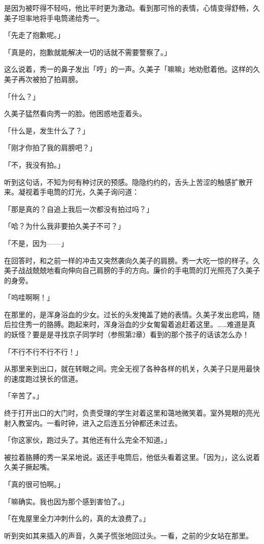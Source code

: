 \documentclass[UTF8]{ctexart}
\begin{document}
    是因为被吓得不轻吗，他比平时更为激动。看到那可怜的表情，心情变得舒畅，久美子坦率地将手电筒递给秀一。

    「先走了抱歉呢。」

    「真是的，抱歉就能解决一切的话就不需要警察了。」

    这么说着，秀一的鼻子发出「哼」的一声。久美子「嘛嘛」地劝慰着他。这样的久美子再次被拍了拍肩膀。

    「什么？」

    久美子猛然看向秀一的脸。他困惑地歪着头。

    「什么是，发生什么了？」

    「刚才你拍了我的肩膀吧？」

    「不，我没有拍。」

    听到这句话，不知为何有种讨厌的预感。隐隐约约的，舌头上苦涩的触感扩散开来。凝视着手电筒的灯光，久美子询问道：

    「那是真的？自追上我后一次都没有拍过吗？」

    「哈？为什么我非要拍久美子不可？」

    「不是，因为——」

    在回答时，和之前一样的冲击又突然袭向久美子的肩膀。秀一大吃一惊的样子。久美子战战兢兢地看向伸向自己肩膀的手的方向。廉价的手电筒的灯光照亮了久美子的身旁。

    「呜哇啊啊！」

    在那里的，是浑身浴血的少女。过长的头发掩盖了她的表情。久美子发出悲鸣，随后拉住秀一的胳膊。跑起来时，浑身浴血的少女匍匐着追赶着这里。……难道是真的妖怪？要是是寻找京子同学时（参照第2章）看到的那个孩子的话该怎么办！

    「不行不行不行不行！」

    从那里来到出口，就在转眼之间。完全无视了各种各样的机关，久美子只是用最快的速度跑过狭长的信道。

    「辛苦了。」

    终于打开出口的大门时，负责受理的学生对着这里和蔼地微笑着。室外晃眼的亮光射入教室内。一看时钟，进入之后连五分钟都还未过去。

    「你这家伙，跑过头了。其他还有什么完全不知道。」

    被拉着胳膊的秀一呆呆地说。返还手电筒后，他低头看着这里。「因为」，这么说着久美子撅起嘴。

    「真的很可怕啊。」

    「嘛确实。我也因为那个感到害怕了。」

    「在鬼屋里全力冲刺什么的，真的太浪费了。」

    听到突如其来插入的声音，久美子慌张地回过头。一看，之前的少女站在那里。
\end{document}
